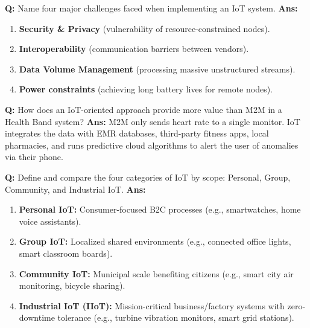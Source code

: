 \documentclass[10pt,a4paper,twocolumn]{article}
\begin{document}
\begin{tcolorbox}[
  colback=white,
  colframe=UnitColorOne,
  colbacktitle=gray!10!white,
  coltitle=black,
  fonttitle=\bfseries\sffamily\small,
  title={Unit I $\bullet$ Card 13},
  boxrule=1.2pt,
  arc=2mm,
  outer arc=2mm,
  boxsep=1.5mm,
  top=1mm,
  bottom=1mm,
  left=1.5mm,
  right=1.5mm,
  before skip=2.5mm,
  after skip=2.5mm
]
\textbf{Q:} Name four major challenges faced when implementing an IoT system.
\tcbline
\textbf{Ans:} \begin{enumerate}
  \item \textbf{Security \& Privacy} (vulnerability of resource-constrained nodes).
  \item \textbf{Interoperability} (communication barriers between vendors).
  \item \textbf{Data Volume Management} (processing massive unstructured streams).
  \item \textbf{Power constraints} (achieving long battery lives for remote nodes).
\end{enumerate}
\end{tcolorbox}


\begin{tcolorbox}[
  colback=white,
  colframe=UnitColorOne,
  colbacktitle=gray!10!white,
  coltitle=black,
  fonttitle=\bfseries\sffamily\small,
  title={Unit I $\bullet$ Card 14},
  boxrule=1.2pt,
  arc=2mm,
  outer arc=2mm,
  boxsep=1.5mm,
  top=1mm,
  bottom=1mm,
  left=1.5mm,
  right=1.5mm,
  before skip=2.5mm,
  after skip=2.5mm
]
\textbf{Q:} How does an IoT-oriented approach provide more value than M2M in a Health Band system?
\tcbline
\textbf{Ans:} M2M only sends heart rate to a single monitor. IoT integrates the data with EMR databases, third-party fitness apps, local pharmacies, and runs predictive cloud algorithms to alert the user of anomalies via their phone.
\end{tcolorbox}


\begin{tcolorbox}[
  colback=white,
  colframe=UnitColorOne,
  colbacktitle=gray!10!white,
  coltitle=black,
  fonttitle=\bfseries\sffamily\small,
  title={Unit I $\bullet$ Card 15},
  boxrule=1.2pt,
  arc=2mm,
  outer arc=2mm,
  boxsep=1.5mm,
  top=1mm,
  bottom=1mm,
  left=1.5mm,
  right=1.5mm,
  before skip=2.5mm,
  after skip=2.5mm
]
\textbf{Q:} Define and compare the four categories of IoT by scope: Personal, Group, Community, and Industrial IoT.
\tcbline
\textbf{Ans:} \begin{enumerate}
  \item \textbf{Personal IoT:} Consumer-focused B2C processes (e.g., smartwatches, home voice assistants).
  \item \textbf{Group IoT:} Localized shared environments (e.g., connected office lights, smart classroom boards).
  \item \textbf{Community IoT:} Municipal scale benefiting citizens (e.g., smart city air monitoring, bicycle sharing).
  \item \textbf{Industrial IoT (IIoT):} Mission-critical business/factory systems with zero-downtime tolerance (e.g., turbine vibration monitors, smart grid stations).
\end{enumerate}
\end{tcolorbox}
\end{document}

